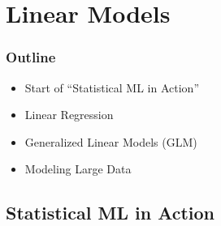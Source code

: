 \section{Linear Models}

\begin{frame}
	\frametitle{Outline}
	
	\begin{itemize}
		\item Start of ``Statistical ML in Action''
		\item Linear Regression
		\item Generalized Linear Models (GLM)
		\item Modeling Large Data
	\end{itemize}
\end{frame}

\subsection{Statistical ML in Action}

